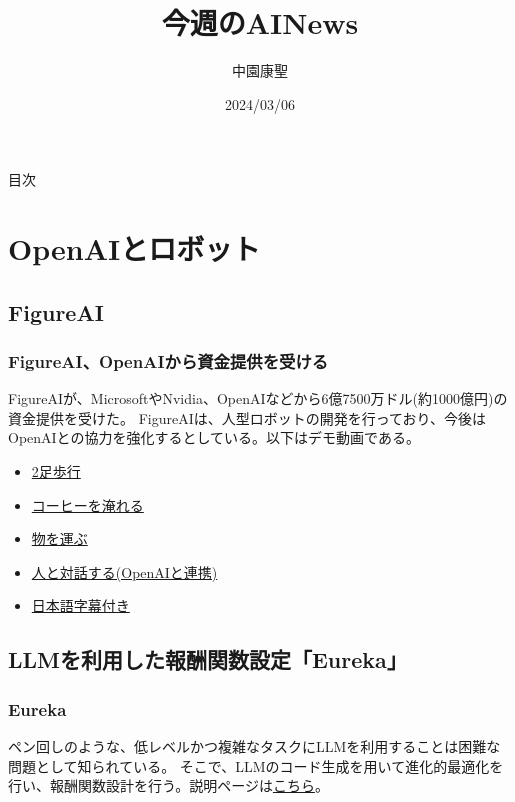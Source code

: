\documentclass[dvipdfmx,12pt]{beamer}%
\title{今週のAINews}
\author{中園康聖}
\date{2024/03/06}
\begin{document}
\begin{frame}
\titlepage
\end{frame}
\begin{frame}{目次}
\tableofcontents
\end{frame}
\section{OpenAIとロボット}
\subsection{FigureAI}
\begin{frame}
\frametitle{FigureAI、OpenAIから資金提供を受ける}

FigureAIが、MicrosoftやNvidia、OpenAIなどから6億7500万ドル(約1000億円)の資金提供を受けた。
FigureAIは、人型ロボットの開発を行っており、今後はOpenAIとの協力を強化するとしている。以下はデモ動画である。
\begin{itemize}
\item \href{https://www.youtube.com/watch?v=-4erYt2t7Bs}{2足歩行}
\item \href{https://www.youtube.com/watch?v=Q5MKo7Idsok}{コーヒーを淹れる}
\item \href{https://www.youtube.com/watch?v=gEjXcEU3BbwURL}{物を運ぶ}
\item \href{https://www.youtube.com/watch?v=Sq1QZB5baNw}{人と対話する(OpenAIと連携)}
\item \href{https://twitter.com/ctgptlb/status/1767919292836945922?s=12&t=HWsH9aiIPwtM8W1pjX9WBA}{日本語字幕付き}
\end{itemize}
\end{frame}

\subsection{LLMを利用した報酬関数設定「Eureka」}
\begin{frame}
\frametitle{Eureka}
ペン回しのような、低レベルかつ複雑なタスクにLLMを利用することは困難な問題として知られている。
そこで、LLMのコード生成を用いて進化的最適化を行い、報酬関数設計を行う。説明ページは\href{https://eureka-research.github.io/}{こちら}。
\end{frame}
\end{document}
